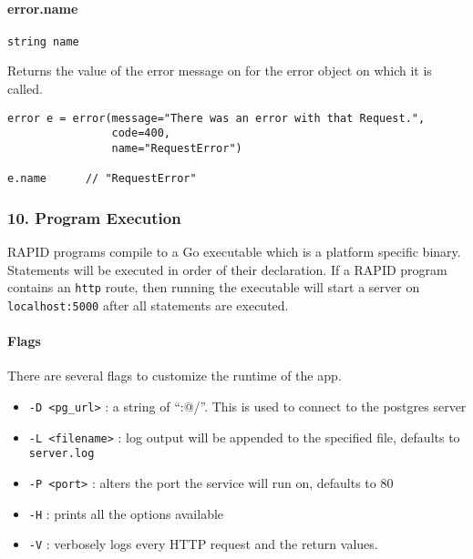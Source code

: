 \paragraph{error.name}\label{error.name}

\begin{verbatim}
string name
\end{verbatim}

Returns the value of the error message on for the error object on which
it is called.

\begin{verbatim}
error e = error(message="There was an error with that Request.",
                code=400,
                name="RequestError")

e.name      // "RequestError"
\end{verbatim}

\subsubsection*{10. Program Execution}\label{program-execution}

RAPID programs compile to a Go executable which is a platform specific
binary. Statements will be executed in order of their declaration. If a
RAPID program contains an \texttt{http} route, then running the
executable will start a server on \texttt{localhost:5000} after all
statements are executed.

\paragraph{Flags}\label{flags}

There are several flags to customize the runtime of the app.

\begin{itemize}
\itemsep1pt\parskip0pt
\item
  \texttt{-D \textless{}pg\_url\textgreater{}} : a string of ``:@/''.
  This is used to connect to the postgres server
\item
  \texttt{-L \textless{}filename\textgreater{}} : log output will be
  appended to the specified file, defaults to \texttt{server.log}
\item
  \texttt{-P \textless{}port\textgreater{}} : alters the port the
  service will run on, defaults to 80
\item
  \texttt{-H} : prints all the options available
\item
  \texttt{-V} : verbosely logs every HTTP request and the return values.
\end{itemize}
